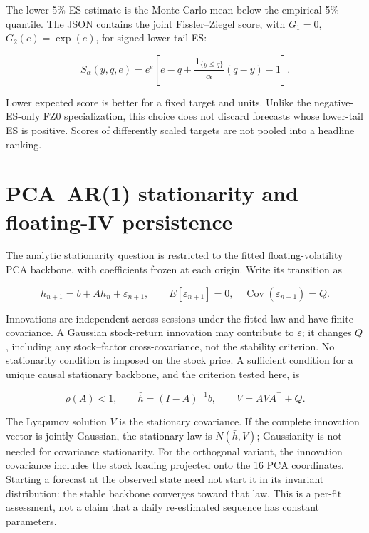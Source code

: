 \documentclass[11pt]{article}
\begin{document}
The lower 5\% ES estimate is the Monte Carlo mean below the empirical 5\% quantile. The JSON contains the joint Fissler--Ziegel score, with $G_1=0$, $G_2(e)=\exp(e)$, for signed lower-tail ES:

\[S_\alpha(y,q,e)=e^e\left[e-q+\frac{\mathbf1_{\{y\le q\}}}{\alpha}(q-y)-1\right].\]

Lower expected score is better for a fixed target and units. Unlike the negative-ES-only FZ0 specialization, this choice does not discard forecasts whose lower-tail ES is positive. Scores of differently scaled targets are not pooled into a headline ranking.

\section{PCA--AR(1) stationarity and floating-IV persistence}

The analytic stationarity question is restricted to the fitted floating-volatility PCA backbone, with coefficients frozen at each origin. Write its transition as

\begin{equation} h_{n+1}=b+A h_n+\varepsilon_{n+1},\qquad E[\varepsilon_{n+1}]=0,\quad\operatorname{Cov}(\varepsilon_{n+1})=Q.\end{equation}

Innovations are independent across sessions under the fitted law and have finite covariance. A Gaussian stock-return innovation may contribute to $\varepsilon$; it changes $Q$, including any stock--factor cross-covariance, not the stability criterion. No stationarity condition is imposed on the stock price. A sufficient condition for a unique causal stationary backbone, and the criterion tested here, is

\begin{equation}\rho(A)<1,\qquad \bar h=(I-A)^{-1}b,\qquad V=A V A^\top+Q.\end{equation}

The Lyapunov solution $V$ is the stationary covariance. If the complete innovation vector is jointly Gaussian, the stationary law is $N(\bar h,V)$; Gaussianity is not needed for covariance stationarity. For the orthogonal variant, the innovation covariance includes the stock loading projected onto the 16 PCA coordinates. Starting a forecast at the observed state need not start it in its invariant distribution: the stable backbone converges toward that law. This is a per-fit assessment, not a claim that a daily re-estimated sequence has constant parameters.
\end{document}
